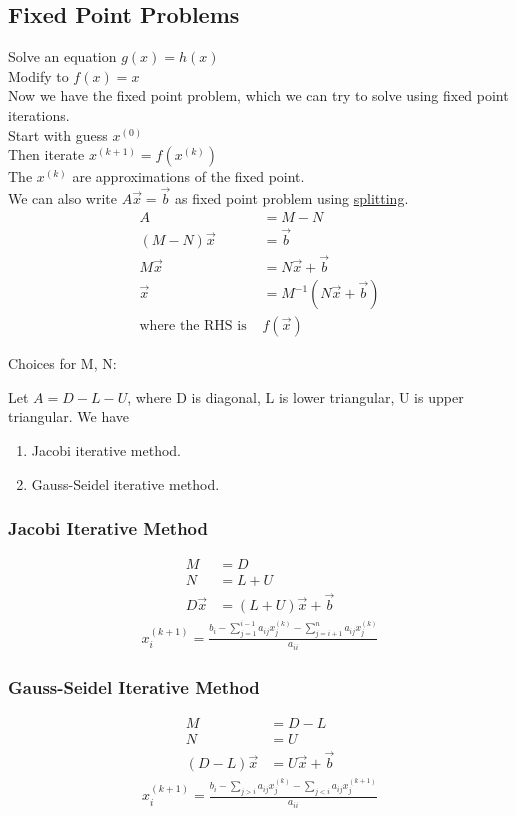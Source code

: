 \documentclass[12pt, letterpaper]{article}
\begin{document}
\subsection{Fixed Point Problems}

Solve an equation $g(x)= h(x)$ \\
Modify to $f(x)= x$ \\ 

Now we have the fixed point problem, which we can try to solve using fixed point iterations. \\

\noindent Start with guess $x^{(0)}$\\
Then iterate $x^{(k+1)}=f(x^{(k)})$ \\
The $x^{(k)}$ are approximations of the fixed point. \\ 

We can also write $A\vec x = \vec b$ as fixed point problem using \underline{splitting}.
\begin{align*}
    A &= M-N \\
    (M-N)\vec x &= \vec b \\
    M\vec x &= N\vec x+ \vec b \\
    \vec x &= M^{-1}(N\vec x +\vec b) \\
    \text{where the RHS is }&f(\vec x)
\end{align*}

\noindent Choices for M, N: 

Let $A=D-L-U$, where D is diagonal, L is lower triangular, U is upper triangular. We have
\begin{enumerate}
    \item Jacobi iterative method.
    \item Gauss-Seidel iterative method.
\end{enumerate}
\subsubsection{Jacobi Iterative Method}
\begin{align*}
            M&=D \\ 
            N&=L+U \\ 
            D\vec x &= (L+U)\vec x +\vec b
        \end{align*}
\begin{align*}
     x_i^{(k+1)}=\frac{b_i-\displaystyle\sum_{j=1}^{i-1}a_{ij}x^{(k)}_j-\sum_{j=i+1}^{n} a_{ij} x_j^{(k)}}{a_{ii}}
\end{align*}
\subsubsection{Gauss-Seidel Iterative Method}
\begin{align*}
            M&=D-L \\ 
            N&= U \\
            (D-L)\vec x &= U\vec x + \vec b
        \end{align*}
\begin{align*}
    x_i^{(k+1)}=\frac{b_i-\displaystyle\sum_{j>i}^{}a_{ij}x^{(k)}_j-\sum_{j<i}^{} a_{ij} x_j^{(k+1)}}{a_{ii}}
\end{align*}
\end{document}
